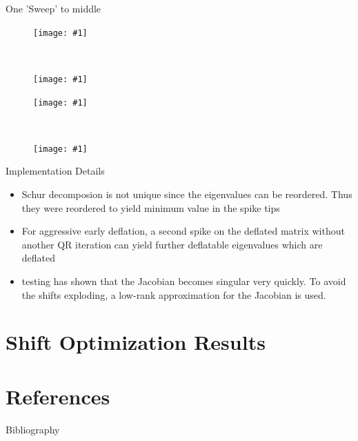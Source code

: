 \documentclass[12pt]{beamer}
\newcommand{\pic}[1]{\texttt{[image: \#1]}}
\begin{document}
  \begin{frame}{One 'Sweep' to middle}
    \vspace*{-.8cm}
    \begin{figure}[h!]
      \centering
      \begin{minipage}[t]{.5\linewidth}
        \centering
        \pic{midDef1}
      \end{minipage}~
      \begin{minipage}[t]{.5\linewidth}
        \centering
        \pic{midDef2}
      \end{minipage}

      \begin{minipage}[b]{.5\linewidth}
        \centering
        \pic{midDef3}
      \end{minipage}~
      \begin{minipage}[b]{.5\linewidth}
        \centering
        \pic{midDef4}
      \end{minipage}%
    \end{figure}
  \end{frame}

  \begin{frame}{Implementation Details}
    \begin{itemize}
      \item Schur decomposion is not unique since the eigenvalues can be reordered.
        Thus they were reordered to yield minimum value in the spike tips
      \item For aggressive early deflation, a second spike on the deflated matrix
        without another QR iteration can yield further deflatable eigenvalues which are deflated\cite{}
      \item testing has shown that the Jacobian becomes singular very quickly.
        To avoid the shifts exploding, a low-rank approximation for the Jacobian is used.
    \end{itemize}
  \end{frame}

	\section{Shift Optimization Results}
	\begin{frame}{}
	\end{frame}
	
	\section{References}
	\nocite{*}
	\begin{frame}{Bibliography}
		
		
	\end{frame}
	
\end{document}
